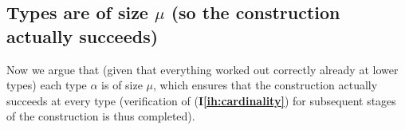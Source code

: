 \documentclass[112pt]{article}
\theoremstyle{definition}
\theoremstyle{remark}
\newcommand{\ihref}[1]{(\textbf{I\ref{#1}})}
\begin{document}
\begin{comment}
In this way we have computed $\pi^*_A(L_{{\tt min}(A)})^\circ$ in every case and above we indicate how to compute $\pi^*_A(L_{{\tt min}(A)})$ exactly given this.

 The process given will compute $\pi_A(x)$ and $\pi_A^{-1}(x)$ for every atom $x$ and every $A$ containing $-1$.  Since every action on every atom is fixed, $\pi$ is fixed as a structural permutation.

The method by which the derivatives of $\pi$ are evaluated at atoms ensures that $\pi_A$ agrees with $\pi^0_A$ on typed singletons.  It also ensures that (if $\pi$ and its derivatives defined as indicated satisfy
the coherence conditions) $\pi_{A \cup \{-1\}}$ has an exception $x$ only if $\{x\}$ is in the domain of $\pi^0_A$.

The method of computation verifies that the coherence conditions will hold.  The method of computation also verifies that $\pi$ is a permutation, as $\pi^{-1}$ is computed in precisely the same way from $(\pi^0)^{-1}$.
\end{proof}

\end{comment}

\newpage
\subsection{Types are of size $\mu$ (so the construction actually succeeds)}

Now we argue that (given that everything worked out correctly already at lower types) each type $\alpha$ is of size $\mu$, which ensures
that the construction actually succeeds at every type (verification of \ihref{ih:cardinality} for subsequent stages of the construction is thus completed).
\end{document}
